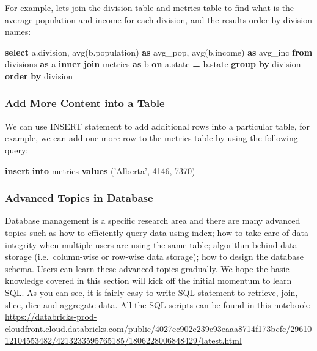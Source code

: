 \documentclass[
]{article}
\newenvironment{Shaded}{\begin{snugshade}}{\end{snugshade}}
\newcommand{\DecValTok}[1]{\textcolor[rgb]{0.00,0.00,0.81}{#1}}
\newcommand{\FunctionTok}[1]{\textcolor[rgb]{0.00,0.00,0.00}{#1}}
\newcommand{\KeywordTok}[1]{\textcolor[rgb]{0.13,0.29,0.53}{\textbf{#1}}}
\newcommand{\NormalTok}[1]{#1}
\newcommand{\OperatorTok}[1]{\textcolor[rgb]{0.81,0.36,0.00}{\textbf{#1}}}
\newcommand{\StringTok}[1]{\textcolor[rgb]{0.31,0.60,0.02}{#1}}
\begin{document}
For example, lets join the division table and metrics table to find what
is the average population and income for each division, and the results
order by division names:

\begin{Shaded}
\begin{Highlighting}[]
\KeywordTok{select}\NormalTok{ a.division, }\FunctionTok{avg}\NormalTok{(b.population) }\KeywordTok{as}\NormalTok{ avg_pop,}
     \FunctionTok{avg}\NormalTok{(b.income) }\KeywordTok{as}\NormalTok{ avg_inc}
\KeywordTok{from}\NormalTok{ divisions }\KeywordTok{as}\NormalTok{ a}
\KeywordTok{inner} \KeywordTok{join}\NormalTok{ metrics }\KeywordTok{as}\NormalTok{ b}
\KeywordTok{on}\NormalTok{ a.state }\OperatorTok{=}\NormalTok{ b.state}
\KeywordTok{group} \KeywordTok{by}\NormalTok{ division}
\KeywordTok{order} \KeywordTok{by}\NormalTok{ division}
\end{Highlighting}
\end{Shaded}

\hypertarget{add-more-content-into-a-table}{%
\subsubsection{Add More Content into a
Table}\label{add-more-content-into-a-table}}

We can use INSERT statement to add additional rows into a particular
table, for example, we can add one more row to the metrics table by
using the following query:

\begin{Shaded}
\begin{Highlighting}[]
\KeywordTok{insert} \KeywordTok{into}\NormalTok{ metrics}
\KeywordTok{values}\NormalTok{ (}\StringTok{'Alberta'}\NormalTok{, }\DecValTok{4146}\NormalTok{, }\DecValTok{7370}\NormalTok{)}
\end{Highlighting}
\end{Shaded}

\hypertarget{advanced-topics-in-database}{%
\subsubsection{Advanced Topics in
Database}\label{advanced-topics-in-database}}

Database management is a specific research area and there are many
advanced topics such as how to efficiently query data using index; how
to take care of data integrity when multiple users are using the same
table; algorithm behind data storage (i.e.~column-wise or row-wise data
storage); how to design the database schema. Users can learn these
advanced topics gradually. We hope the basic knowledge covered in this
section will kick off the initial momentum to learn SQL. As you can see,
it is fairly easy to write SQL statement to retrieve, join, slice, dice
and aggregate data. All the SQL scripts can be found in this notebook:
\url{https://databricks-prod-cloudfront.cloud.databricks.com/public/4027ec902e239c93eaaa8714f173bcfc/2961012104553482/4213233595765185/1806228006848429/latest.html}
\end{document}
